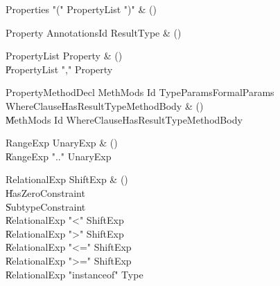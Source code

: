 \begin{bbgrammar}

Properties \label{prod:Properties}  \: \xcd"(" PropertyList \xcd")" & () \\


\end{bbgrammar}

\begin{bbgrammar}

Property \label{prod:Property}  \: Annotations\opt Id ResultType & () \\


\end{bbgrammar}

\begin{bbgrammar}

PropertyList \label{prod:PropertyList}  \: Property & () \\

    \| PropertyList \xcd"," Property \\

\end{bbgrammar}

\begin{bbgrammar}

PropertyMethodDecl \label{prod:PropertyMethodDecl}  \: MethMods Id TypeParams\opt FormalParams WhereClause\opt HasResultType\opt MethodBody & () \\

    \| MethMods Id WhereClause\opt HasResultType\opt MethodBody \\

\end{bbgrammar}

\begin{bbgrammar}

RangeExp \label{prod:RangeExp}  \: UnaryExp & () \\

    \| RangeExp  \xcd".." UnaryExp  \\

\end{bbgrammar}

\begin{bbgrammar}

RelationalExp \label{prod:RelationalExp}  \: ShiftExp & () \\

    \| HasZeroConstraint \\
    \| SubtypeConstraint \\
    \| RelationalExp \xcd"<" ShiftExp \\
    \| RelationalExp \xcd">" ShiftExp \\
    \| RelationalExp \xcd"<=" ShiftExp \\
    \| RelationalExp \xcd">=" ShiftExp \\
    \| RelationalExp \xcd"instanceof" Type \\

\end{bbgrammar}

